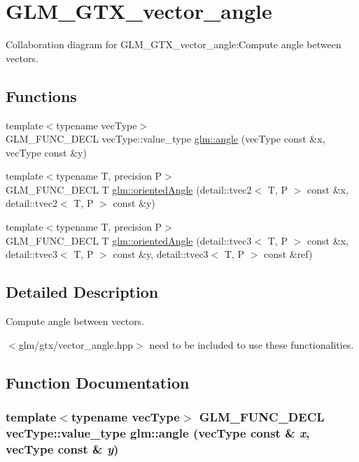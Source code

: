 \hypertarget{group__gtx__vector__angle}{
\section{GLM\_\-GTX\_\-vector\_\-angle}
\label{group__gtx__vector__angle}
}


Collaboration diagram for GLM\_\-GTX\_\-vector\_\-angle:Compute angle between vectors.  
\subsection*{Functions}
\begin{CompactItemize}
\item 
{\footnotesize template$<$typename vecType$>$ }\\GLM\_\-FUNC\_\-DECL vecType::value\_\-type \hyperlink{group__gtx__vector__angle_gb57ebeaf612eb26ab8e47e80b9af2678}{glm::angle} (vecType const \&x, vecType const \&y)
\item 
{\footnotesize template$<$typename T, precision P$>$ }\\GLM\_\-FUNC\_\-DECL T \hyperlink{group__gtx__vector__angle_gfd969749b953f7a58da4a2563d06ea36}{glm::orientedAngle} (detail::tvec2$<$ T, P $>$ const \&x, detail::tvec2$<$ T, P $>$ const \&y)
\item 
{\footnotesize template$<$typename T, precision P$>$ }\\GLM\_\-FUNC\_\-DECL T \hyperlink{group__gtx__vector__angle_gc56a6bdc5d430b476514d64cb185b772}{glm::orientedAngle} (detail::tvec3$<$ T, P $>$ const \&x, detail::tvec3$<$ T, P $>$ const \&y, detail::tvec3$<$ T, P $>$ const \&ref)
\end{CompactItemize}


\subsection{Detailed Description}
Compute angle between vectors. 

$<$glm/gtx/vector\_\-angle.hpp$>$ need to be included to use these functionalities. 

\subsection{Function Documentation}
\hypertarget{group__gtx__vector__angle_gb57ebeaf612eb26ab8e47e80b9af2678}{
\subsubsection[angle]{\setlength{\rightskip}{0pt plus 5cm}template$<$typename vecType$>$ GLM\_\-FUNC\_\-DECL vecType::value\_\-type glm::angle (vecType const \& {\em x}, \/  vecType const \& {\em y})}}
\label{group__gtx__vector__angle_gb57ebeaf612eb26ab8e47e80b9af2678}


